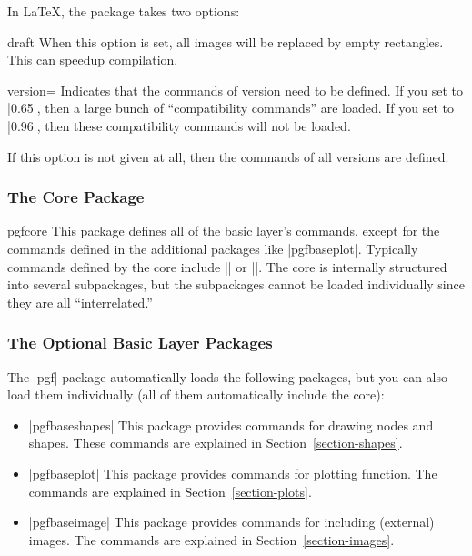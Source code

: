 In \LaTeX, the package takes two options:
\begin{packageoption}{draft}
  When this option is set, all images will be replaced by empty
  rectangles. This can speedup compilation.
\end{packageoption}
 
\begin{packageoption}{version=}
  Indicates that the commands of version  need to be
  defined. If you set  to |0.65|, then a large bunch of
  ``compatibility commands'' are loaded. If you set  to
  |0.96|, then these compatibility commands will not be loaded.

  If this option is not given at all, then the commands of all
  versions are defined.
\end{packageoption}


\subsubsection{The Core Package}

\begin{package}{pgfcore}
  This package defines all of the basic layer's commands, except for
  the commands defined in the additional packages like
  |pgfbaseplot|. Typically commands defined by the core include
  |\pgfusepath| or   |\pgfpoint|. The core is internally structured
  into several subpackages, but the subpackages cannot be loaded
  individually since they are all ``interrelated.''
\end{package}


\subsubsection{The Optional Basic Layer Packages}

The |pgf| package automatically loads the following packages, but you
can also load them individually (all of them automatically include the
core):

\begin{itemize}
  \item |pgfbaseshapes|
  This package provides commands for drawing nodes and shapes. These
  commands are explained in Section~\ref{section-shapes}.

  \item |pgfbaseplot|
  This package provides commands for plotting function. The
  commands are explained in Section~\ref{section-plots}.

  \item |pgfbaseimage|
  This package provides commands for including (external) images. The 
  commands are explained in Section~\ref{section-images}.
\end{itemize}





